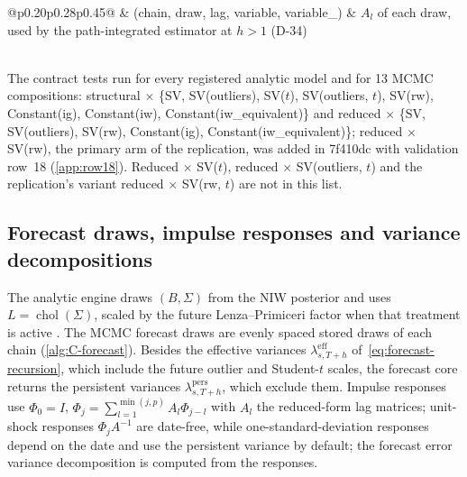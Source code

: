 \begin{table}[!htbp]
\begin{tabular}{@{}p{0.20\linewidth}p{0.28\linewidth}p{0.45\linewidth}@{}}
 & (chain, draw, lag, variable, variable\_) & $A_l$ of each draw, used by the path-integrated estimator at $h > 1$ (D-34) \\
\midrule
{} \\
\bottomrule
\end{tabular}
\end{table}

The contract tests run for every registered analytic model and for 13 MCMC compositions:
structural $\times$ \{SV, SV(outliers), SV($t$), SV(outliers, $t$), SV(rw), Constant(ig),
Constant(iw), Constant(iw\_equivalent)\} and reduced $\times$ \{SV, SV(outliers), SV(rw),
Constant(ig), Constant(iw\_equivalent)\}; reduced $\times$ SV(rw), the primary arm of the
replication, was added in 7f410dc with validation row~18 (\cref{app:row18}).
Reduced $\times$ SV($t$), reduced $\times$ SV(outliers, $t$) and the replication's variant
reduced $\times$ SV(rw, $t$) are not in this list.

\subsection{Forecast draws, impulse responses and variance decompositions}\label{app:irf}

The analytic engine draws $(B, \Sigma)$ from the NIW posterior and uses
$L = \operatorname{chol}(\Sigma)$, scaled by the future Lenza--Primiceri factor when that treatment
is active \citep{lenza2022estimate}.
The MCMC forecast draws are evenly spaced stored draws of each chain
(\cref{alg:C-forecast}).
Besides the effective variances $\lambda^{\mathrm{eff}}_{s,T+h}$ of~\eqref{eq:forecast-recursion},
which include the future outlier and Student-$t$ scales, the forecast core returns the persistent
variances $\lambda^{\mathrm{pers}}_{s,T+h}$, which exclude them.
Impulse responses use $\Phi_0 = I$, $\Phi_j = \sum_{l=1}^{\min(j,p)} A_l\Phi_{j-l}$ with $A_l$ the
reduced-form lag matrices; unit-shock responses $\Phi_j A^{-1}$ are date-free, while
one-standard-deviation responses depend on the date and use the persistent variance by default;
the forecast error variance decomposition is computed from the responses.

